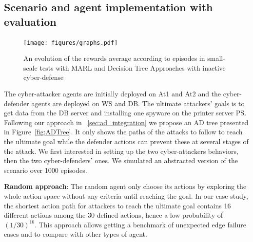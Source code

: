 


\subsection{Scenario and agent implementation with evaluation}

\begin{figure}
    \centering
    \texttt{[image: figures/graphs.pdf]}
    \caption{An evolution of the rewards average according to episodes in small-scale tests with MARL and Decision Tree Approaches with inactive cyber-defense
    }
    \label{fig:graphs}
\end{figure}

\noindent
The cyber-attacker agents are initially deployed on At1 and At2 and the cyber-defender agents are deployed on WS and DB. The ultimate attackers' goals is to get data from the DB server and installing one spyware on the printer server PS. Following our approach in ~\ref{sec:ad_integration} we propose an AD tree presented in Figure~\ref{fig:ADTree}. It only shows the paths of the attacks to follow to reach the ultimate goal while the defender actions can prevent these at several stages of the attack.
We first interested in setting up the two cyber-attackers behaviors, then the two cyber-defenders' ones. We simulated an abstracted version of the scenario over 1000 episodes.




\noindent
\textbf{Random approach}: \quad The random agent only choose its actions by exploring the whole action space without any criteria until reaching the goal. In our case study, the shortest action path for attackers to reach the ultimate goal contains 16 different actions among the 30 defined actions, hence a low probability of $(1/30)^{16}$.
This approach allows getting a benchmark of unexpected edge failure cases and to compare with other types of agent.

